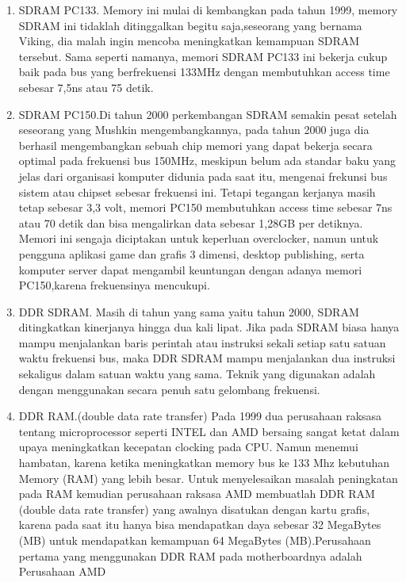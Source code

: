 \begin{enumerate}
\item SDRAM PC133. Memory ini mulai di kembangkan pada tahun 1999, memory SDRAM ini tidaklah ditinggalkan begitu saja,seseorang yang bernama Viking, dia malah ingin mencoba meningkatkan kemampuan SDRAM tersebut. Sama seperti namanya, memori SDRAM PC133 ini bekerja cukup baik pada bus yang berfrekuensi 133MHz dengan membutuhkan access time sebesar 7,5ns atau 75 detik.

\item SDRAM PC150.Di tahun 2000 perkembangan SDRAM semakin pesat setelah seseorang yang Mushkin mengembangkannya, pada tahun 2000 juga dia berhasil mengembangkan sebuah chip memori yang dapat bekerja secara optimal pada frekuensi bus 150MHz, meskipun belum ada standar baku yang jelas dari organisasi komputer didunia pada saat itu, mengenai frekunsi bus sistem atau chipset sebesar frekuensi ini. Tetapi tegangan kerjanya masih tetap sebesar 3,3 volt, memori PC150 membutuhkan access time sebesar 7ns atau 70 detik dan bisa mengalirkan data sebesar 1,28GB per detiknya. Memori ini sengaja diciptakan untuk keperluan overclocker, namun untuk pengguna aplikasi game dan grafis 3 dimensi, desktop publishing, serta komputer server dapat mengambil keuntungan dengan adanya memori PC150,karena frekuensinya mencukupi.

\item DDR SDRAM. Masih di tahun yang sama yaitu tahun 2000, SDRAM ditingkatkan kinerjanya hingga dua kali lipat. Jika pada SDRAM biasa hanya mampu menjalankan baris perintah atau instruksi sekali setiap satu satuan waktu frekuensi bus, maka DDR SDRAM mampu menjalankan dua instruksi sekaligus dalam satuan waktu yang sama. Teknik yang digunakan adalah dengan menggunakan secara penuh satu gelombang frekuensi.

\item DDR RAM.(double data rate transfer) Pada 1999 dua perusahaan raksasa tentang microprocessor seperti INTEL dan AMD bersaing sangat ketat dalam upaya meningkatkan kecepatan clocking pada CPU. Namun menemui hambatan, karena ketika meningkatkan memory bus ke 133 Mhz kebutuhan Memory (RAM) yang lebih besar. Untuk menyelesaikan masalah peningkatan pada RAM kemudian perusahaan raksasa AMD membuatlah DDR RAM (double data rate transfer) yang awalnya disatukan dengan kartu grafis, karena pada saat itu hanya bisa mendapatkan daya sebesar 32 MegaBytes (MB) untuk mendapatkan kemampuan 64 MegaBytes (MB).Perusahaan pertama yang menggunakan DDR RAM pada motherboardnya adalah Perusahaan AMD


\end{enumerate}
